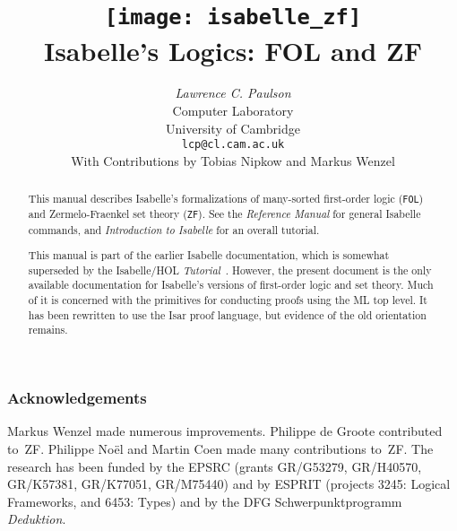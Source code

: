 \documentclass[11pt,a4paper]{report}
\title{\texttt{[image: isabelle\_zf]} \\[4ex] 
       Isabelle's Logics: FOL and ZF}
\author{{\em Lawrence C. Paulson}\\
        Computer Laboratory \\ University of Cambridge \\
        \texttt{lcp@cl.cam.ac.uk}\\[3ex] 
        With Contributions by Tobias Nipkow and Markus Wenzel}
\begin{document}
\maketitle 

\begin{abstract}
This manual describes Isabelle's formalizations of many-sorted first-order
logic (\texttt{FOL}) and Zermelo-Fraenkel set theory (\texttt{ZF}).  See the
\emph{Reference Manual} for general Isabelle commands, and \emph{Introduction
  to Isabelle} for an overall tutorial.

This manual is part of the earlier Isabelle documentation, 
which is somewhat superseded by the Isabelle/HOL
\emph{Tutorial}~\cite{isa-tutorial}. However, the present document is the
only available documentation for Isabelle's versions of first-order logic
and set theory. Much of it is concerned with 
the primitives for conducting proofs 
using the ML top level.  It has been rewritten to use the Isar proof
language, but evidence of the old \ML{} orientation remains.
\end{abstract}


\subsubsection*{Acknowledgements} 
Markus Wenzel made numerous improvements.
    Philippe de Groote contributed to~ZF.  Philippe No\"el and
    Martin Coen made many contributions to~ZF.  The research has 
    been funded by the EPSRC (grants GR/G53279, GR/H40570, GR/K57381,
    GR/K77051, GR/M75440) and by ESPRIT (projects 3245:
    Logical Frameworks, and 6453: Types) and by the DFG Schwerpunktprogramm
    \emph{Deduktion}.
    
 \tableofcontents \cleardoublepage
{} 
\setcounter{page}{1} 





\printindex
\end{document}
